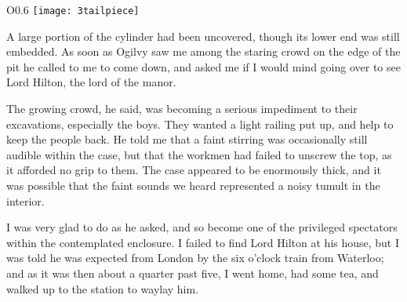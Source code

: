 \begin{wrapfigure}{O}{0.6\textwidth}
\centering
\texttt{[image: 3tailpiece]}
\end{wrapfigure}




A large portion of the cylinder had been uncovered, though its lower end was still embedded. As soon as Ogilvy saw me among the staring crowd on the edge of the pit he called to me to come down, and asked me if I would mind going over to see Lord Hilton, the lord of the manor.

The growing crowd, he said, was becoming a serious impediment to their excavations, especially the boys. They wanted a light railing put up, and help to keep the people back. He told me that a faint stirring was occasionally still audible within the case, but that the workmen had failed to unscrew the top, as it afforded no grip to them. The case appeared to be enormously thick, and it was possible that the faint sounds we heard represented a noisy tumult in the interior.

I was very glad to do as he asked, and so become one of the privileged spectators within the contemplated enclosure. I failed to find Lord Hilton at his house, but I was told he was expected from London by the six o'clock train from Waterloo; and as it was then about a quarter past five, I went home, had some tea, and walked up to the station to waylay him.

